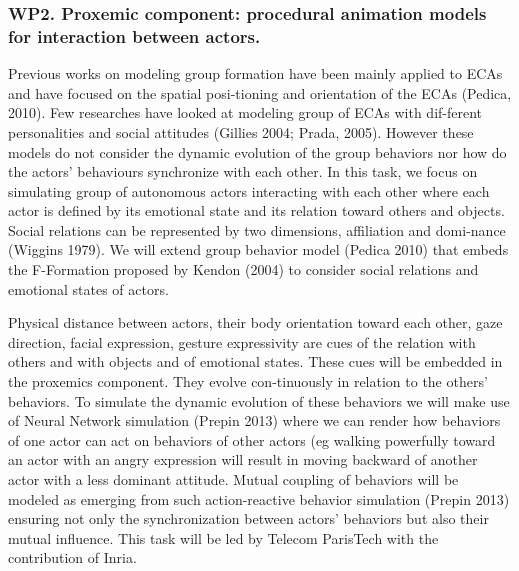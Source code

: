 

\subsubsection{WP2. Proxemic component: procedural animation models for interaction between actors.}

Previous works on modeling group formation have been mainly applied to ECAs and have focused on the spatial posi-tioning and orientation of the ECAs (Pedica, 2010). Few researches have looked at modeling group of ECAs with dif-ferent personalities and social attitudes (Gillies 2004; Prada, 2005). However these models do not consider the dynamic evolution of the group behaviors nor how do the actors' behaviours synchronize with each other. In this task, we focus on simulating group of autonomous actors interacting with each other where each actor is defined by its emotional state and its relation toward others and objects. Social relations can be represented by two dimensions, affiliation and domi-nance (Wiggins 1979). We will extend group behavior model (Pedica 2010) that embeds the F-Formation proposed by Kendon (2004) to consider social relations and emotional states of actors. 

Physical distance between actors, their body orientation toward each other, gaze direction, facial expression, gesture expressivity are cues of the relation with others and with objects and of emotional states. These cues will be embedded in the proxemics component. They evolve con-tinuously in relation to the others' behaviors. To simulate the dynamic evolution of these behaviors we will make use of Neural Network simulation (Prepin 2013) where we can render how behaviors of one actor can act on behaviors of other actors (eg walking powerfully toward an actor with an angry expression will result in moving backward of another actor with a less dominant attitude. Mutual coupling of behaviors will be modeled as emerging from such action-reactive behavior simulation (Prepin 2013) ensuring not only the synchronization between actors' behaviors but also their mutual influence. This task will be led by Telecom ParisTech with the contribution of Inria.

\endinput